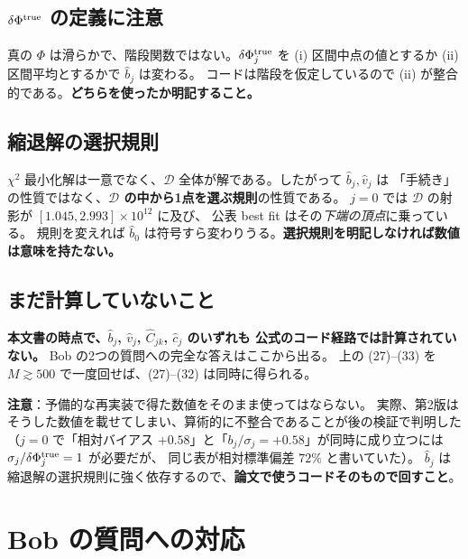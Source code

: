 \documentclass[11pt,a4paper]{ltjsarticle}
\newcommand{\dP}{\delta\Phi}
\begin{document}
\subsection*{$\dP^{\rm true}$ の定義に注意}
真の $\Phi$ は滑らかで、階段関数ではない。$\dP_j^{\rm true}$ を
(i) 区間中点の値とするか (ii) 区間平均とするかで $\hat b_j$ は変わる。
コードは階段を仮定しているので (ii) が整合的である。\textbf{どちらを使ったか明記すること。}

\subsection*{縮退解の選択規則}
$\chi^2$ 最小化解は一意でなく、$\mathcal{D}$ 全体が解である。したがって $\hat b_j,\hat v_j$ は
「手続き」の性質ではなく、\textbf{$\mathcal{D}$ の中から1点を選ぶ規則}の性質である。
$j=0$ では $\mathcal{D}$ の射影が $[1.045,2.993]\times10^{12}$ に及び、
公表 best fit はその\emph{下端の頂点}に乗っている。
規則を変えれば $\hat b_0$ は符号すら変わりうる。\textbf{選択規則を明記しなければ数値は意味を持たない。}

\subsection*{まだ計算していないこと}
\textbf{本文書の時点で、$\hat b_j$, $\hat v_j$, $\hat C_{jk}$, $\hat c_j$ のいずれも
公式のコード経路では計算されていない。} Bob の2つの質問への完全な答えはここから出る。
上の (27)--(33) を $M\gtrsim500$ で一度回せば、(27)--(32) は同時に得られる。

\textbf{注意}：予備的な再実装で得た数値をそのまま使ってはならない。
実際、第2版はそうした数値を載せてしまい、算術的に不整合であることが後の検証で判明した
（$j=0$ で「相対バイアス $+0.58$」と「$b_j/\sigma_j=+0.58$」が同時に成り立つには $\sigma_j/\dP_j^{\rm true}=1$ が必要だが、
同じ表が相対標準偏差 $72\%$ と書いていた）。
$\hat b_j$ は縮退解の選択規則に強く依存するので、\textbf{論文で使うコードそのもので回すこと}。

\section{Bob の質問への対応}
\end{document}

